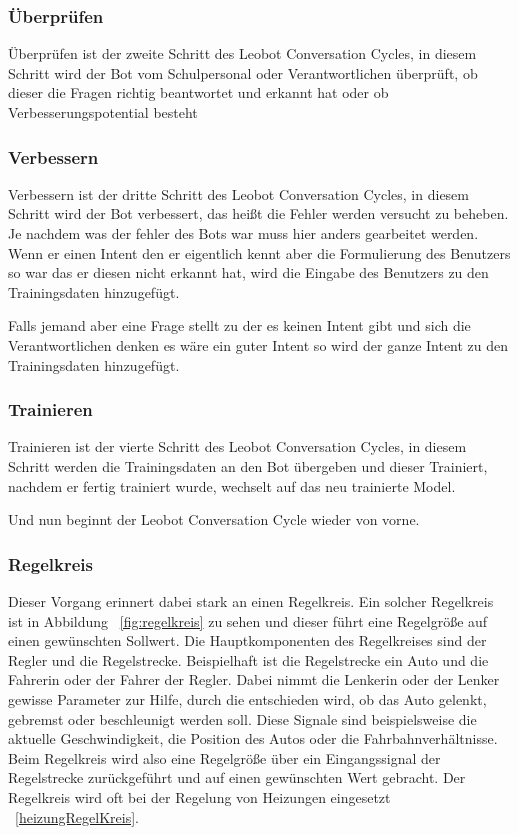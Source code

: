 \subsubsection{Überprüfen}

Überprüfen ist der zweite Schritt des Leobot Conversation Cycles, in diesem Schritt wird der Bot vom Schulpersonal oder Verantwortlichen überprüft, ob dieser die Fragen richtig beantwortet und erkannt hat oder ob Verbesserungspotential besteht

\subsubsection{Verbessern}
Verbessern ist der dritte Schritt des Leobot Conversation Cycles, in diesem Schritt wird der Bot verbessert, das heißt die Fehler werden versucht zu beheben.
Je nachdem was der fehler des Bots war muss hier anders gearbeitet werden.
Wenn er einen Intent den er eigentlich kennt aber die Formulierung des Benutzers so war das er diesen nicht erkannt hat, wird die Eingabe des Benutzers zu den Trainingsdaten hinzugefügt.

Falls jemand aber eine Frage stellt zu der es keinen Intent gibt und sich die Verantwortlichen denken es wäre ein guter Intent so wird der ganze Intent zu den Trainingsdaten hinzugefügt.

\subsubsection{Trainieren}
Trainieren ist der vierte Schritt des Leobot Conversation Cycles, in diesem Schritt werden die Trainingsdaten an den Bot übergeben und dieser Trainiert, nachdem er fertig trainiert wurde, wechselt auf das neu trainierte Model.

Und nun beginnt der Leobot Conversation Cycle wieder von vorne.

\subsubsection{Regelkreis}

Dieser Vorgang erinnert dabei stark an einen Regelkreis.
Ein solcher Regelkreis ist in Abbildung ~\ref{fig:regelkreis} zu sehen und dieser führt eine Regelgröße auf einen gewünschten Sollwert.
Die Hauptkomponenten des Regelkreises sind der Regler und die Regelstrecke.
Beispielhaft ist die Regelstrecke ein Auto und die Fahrerin oder der Fahrer der Regler.
Dabei nimmt die Lenkerin oder der Lenker gewisse Parameter zur Hilfe, durch die entschieden wird, ob das Auto gelenkt, gebremst oder beschleunigt werden soll.
Diese Signale sind beispielsweise die aktuelle Geschwindigkeit, die Position des Autos oder die Fahrbahnverhältnisse.
Beim Regelkreis wird also eine Regelgröße über ein Eingangssignal der Regelstrecke zurückgeführt und auf einen gewünschten Wert gebracht.
Der Regelkreis wird oft bei der Regelung von Heizungen eingesetzt ~\ref{heizungRegelKreis}.\cite{regelkreis, regelkreisBeispiel}

